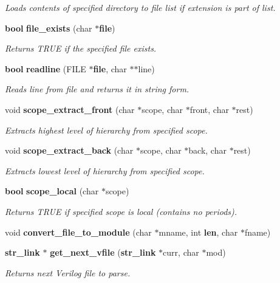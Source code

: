 \begin{CompactItemize}
\begin{CompactList}\small\item\em Loads contents of specified directory to file list if extension is part of list.\item\end{CompactList}\item 
{\bf bool} {\bf file\_\-exists} (char $\ast${\bf file})
\begin{CompactList}\small\item\em Returns TRUE if the specified file exists.\item\end{CompactList}\item 
{\bf bool} {\bf readline} (FILE $\ast${\bf file}, char $\ast$$\ast$line)
\begin{CompactList}\small\item\em Reads line from file and returns it in string form.\item\end{CompactList}\item 
void {\bf scope\_\-extract\_\-front} (char $\ast$scope, char $\ast$front, char $\ast$rest)
\begin{CompactList}\small\item\em Extracts highest level of hierarchy from specified scope.\item\end{CompactList}\item 
void {\bf scope\_\-extract\_\-back} (char $\ast$scope, char $\ast$back, char $\ast$rest)
\begin{CompactList}\small\item\em Extracts lowest level of hierarchy from specified scope.\item\end{CompactList}\item 
{\bf bool} {\bf scope\_\-local} (char $\ast$scope)
\begin{CompactList}\small\item\em Returns TRUE if specified scope is local (contains no periods).\item\end{CompactList}\item 
void {\bf convert\_\-file\_\-to\_\-module} (char $\ast$mname, int {\bf len}, char $\ast$fname)
\item 
{\bf str\_\-link} $\ast$ {\bf get\_\-next\_\-vfile} ({\bf str\_\-link} $\ast$curr, char $\ast$mod)
\begin{CompactList}\small\item\em Returns next Verilog file to parse.\item\end{CompactList}\item 
$$
\end{CompactItemize}
